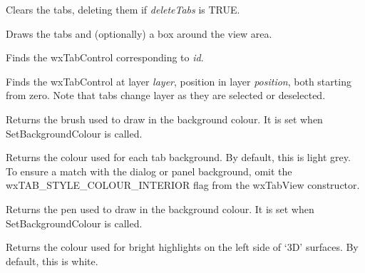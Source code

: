 
Clears the tabs, deleting them if {\it deleteTabs} is TRUE.



Draws the tabs and (optionally) a box around the view area.



Finds the wxTabControl corresponding to {\it id}.



Finds the wxTabControl at layer {\it layer}, position in layer {\it position}, both starting from
zero. Note that tabs change layer as they are selected or deselected.



Returns the brush used to draw in the background colour. It is set when
SetBackgroundColour is called. 



Returns the colour used for each tab background. By default, this is
light grey. To ensure a match with the dialog or panel background, omit
the wxTAB\_STYLE\_COLOUR\_INTERIOR flag from the wxTabView constructor. 



Returns the pen used to draw in the background colour. It is set when
SetBackgroundColour is called. 



Returns the colour used for bright highlights on the left side of `3D' surfaces. By default, this is white.


